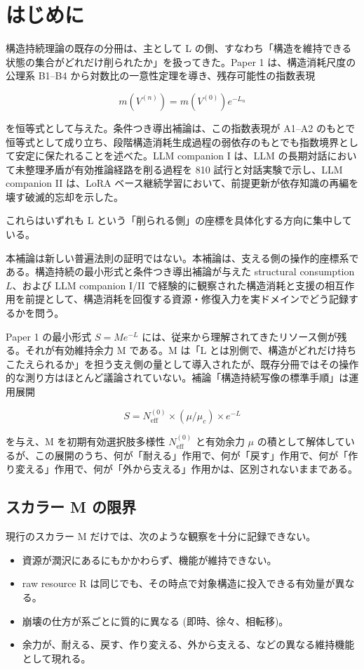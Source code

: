 \documentclass[12pt,a4paper]{article}
\begin{document}
\section{はじめに}\label{ux306fux3058ux3081ux306b}

構造持続理論の既存の分冊は、主として L の側、すなわち「構造を維持できる状態の集合がどれだけ削られたか」を扱ってきた。Paper 1 は、構造消耗尺度の公理系 B1--B4 から対数比の一意性定理を導き、残存可能性の指数表現

\[
m(V^{(n)}) = m(V^{(0)}) e^{-L_{n}}
\]

を恒等式として与えた。条件つき導出補論は、この指数表現が A1--A2 のもとで恒等式として成り立ち、段階構造消耗生成過程の弱依存のもとでも指数境界として安定に保たれることを述べた。LLM companion I は、LLM の長期対話において未整理矛盾が有効推論経路を削る過程を 810 試行と対話実験で示し、LLM companion II は、LoRA ベース継続学習において、前提更新が依存知識の再編を壊す破滅的忘却を示した。

これらはいずれも L という「削られる側」の座標を具体化する方向に集中している。

本補論は新しい普遍法則の証明ではない。本補論は、支える側の操作的座標系である。構造持続の最小形式と条件つき導出補論が与えた structural consumption \(L\)、および LLM companion I/II で経験的に観察された構造消耗と支援の相互作用を前提として、構造消耗を回復する資源・修復入力を実ドメインでどう記録するかを問う。

Paper 1 の最小形式 \(S = M e^{-L}\) には、従来から理解されてきたリソース側が残る。それが有効維持余力 M である。M は「L とは別側で、構造がどれだけ持ちこたえられるか」を担う支え側の量として導入されたが、既存分冊ではその操作的な測り方はほとんど議論されていない。補論「構造持続写像の標準手順」は運用展開

\[
S = N_{\mathrm{eff}}^{(0)} \times (\mu / \mu_{c}) \times e^{-L}
\]

を与え、M を初期有効選択肢多様性 \(N_{\mathrm{eff}}^{(0)}\) と有効余力 \(\mu\) の積として解体しているが、この展開のうち、何が「耐える」作用で、何が「戻す」作用で、何が「作り変える」作用で、何が「外から支える」作用かは、区別されないままである。

\subsection{スカラー M の限界}\label{ux30b9ux30abux30e9ux30fc-m-ux306eux9650ux754c}

現行のスカラー M だけでは、次のような観察を十分に記録できない。

\begin{itemize}
\tightlist
\item
  資源が潤沢にあるにもかかわらず、機能が維持できない。
\item
  raw resource R は同じでも、その時点で対象構造に投入できる有効量が異なる。
\item
  崩壊の仕方が系ごとに質的に異なる (即時、徐々、相転移)。
\item
  余力が、耐える、戻す、作り変える、外から支える、などの異なる維持機能として現れる。
\end{itemize}
\end{document}
